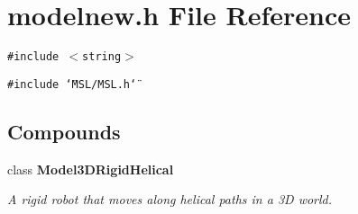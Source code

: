 \section{modelnew.h File Reference}
\label{modelnew_8h}
{\tt \#include $<$string$>$}\par
{\tt \#include \char`\"{}MSL/MSL.h\char`\"{}}\par
\subsection*{Compounds}
\begin{CompactItemize}
\item 
class {\bf Model3DRigid\-Helical}
\begin{CompactList}\small\item\em A rigid robot that moves along helical paths in a 3D world.\item\end{CompactList}\end{CompactItemize}
